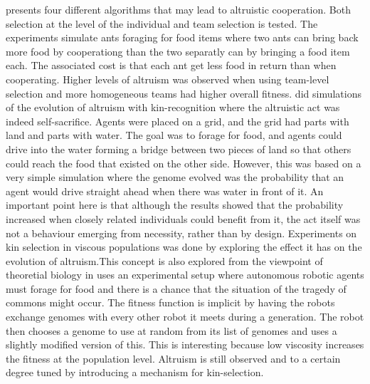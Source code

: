 \documentclass[a4paper]{book}
\begin{document}
\cite{floreano_evolution_2008} presents four different algorithms that may lead to altruistic cooperation. Both selection at the level of the individual and team selection is tested. The experiments simulate ants foraging for food items where two ants can bring back more food by cooperationg than the two separatly can by bringing a food item each. The associated cost is that each ant get less food in return than when cooperating. Higher levels of altruism was observed when using team-level selection and more homogeneous teams had higher overall fitness. 
\cite{martijn_brinkers_evolution_1999} did simulations of the evolution of altruism with kin-recognition where the altruistic act was indeed self-sacrifice. Agents were placed on a grid, and the grid had parts with land and parts with water. The goal was to forage for food, and agents could drive into the water forming a bridge between two pieces of land so that others could reach the food that existed on the other side. However, this was based on a very simple simulation where the genome evolved was the probability that an agent would drive straight ahead when there was water in front of it. An important point here is that although the results showed that the probability increased when closely related individuals could benefit from it, the act itself was not a behaviour emerging from necessity, rather than by design. 
Experiments on kin selection in viscous populations was done by \cite{dulk_evolution_2000} exploring the effect it has on the evolution of altruism.This concept is also explored from the viewpoint of theoretial biology in \cite{mitteldorf_population_2000} 
\cite{montanier_surviving_2011} uses an experimental setup where autonomous robotic agents must forage for food and there is a chance that the situation of the tragedy of commons might occur. The fitness function is implicit by having the robots exchange genomes with every other robot it meets during a generation. The robot then chooses a genome to use at random from its list of genomes and uses a slightly modified version of this. This is interesting because low viscosity increases the fitness at the population level. Altruism is still observed and to a certain degree tuned by introducing a mechanism for kin-selection. 









 
\end{document}
